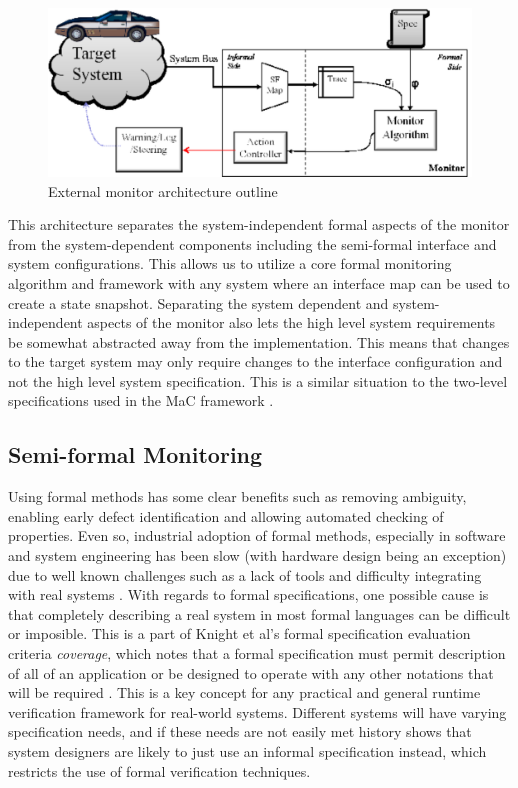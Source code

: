 \documentclass[]{../llncs/llncs}
\begin{document}
\begin{figure}
\includegraphics[width=4.5in]{img/mon_arch}
\caption{External monitor architecture outline \label{fig:architecture}}
\end{figure}

This architecture separates the system-independent formal aspects of the monitor from the system-dependent components including the semi-formal interface and system configurations. 
This allows us to utilize a core formal monitoring algorithm and framework with any system where an interface map can be used to create a state snapshot. 
Separating the system dependent and system-independent aspects of the monitor also lets the high level system requirements be somewhat abstracted away from the implementation. This means that changes to the target system may only require changes to the interface configuration and not the high level system specification. This is a similar situation to the two-level specifications used in the MaC framework \cite{Kim2004}.

\subsection{Semi-formal Monitoring}
Using formal methods has some clear benefits such as removing ambiguity, enabling early defect identification and allowing automated checking of properties. Even so, industrial adoption of formal methods, especially in software and system engineering has been slow (with hardware design being an exception) due to well known challenges such as a lack of tools and difficulty integrating with real systems \cite{Knight1998}. 
%
With regards to formal specifications, one possible cause is that completely describing a real system in most formal languages can be difficult or imposible. This is a part of Knight et al's formal specification evaluation criteria \emph{coverage}, which notes that a formal specification must permit description of all of an application or be designed to operate with any other notations that will be required \cite{Knight1997a}. 
This is a key concept for any practical and general runtime verification framework for real-world systems. Different systems will have varying specification needs, and if these needs are not easily met history shows that system designers are likely to just use an informal specification instead, which restricts the use of formal verification techniques.
\end{document}
